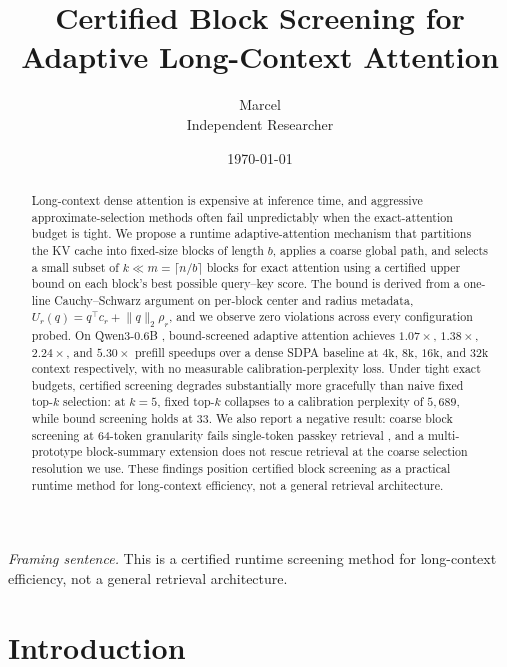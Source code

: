 \documentclass[11pt]{article}
\title{\textbf{Certified Block Screening for Adaptive Long-Context Attention}}
\author{Marcel \\ \small{Independent Researcher}}
\date{\today}
\theoremstyle{plain}
\theoremstyle{definition}
\newcommand{\ur}{U_r}
\newcommand{\normq}{\lVert q \rVert_2}
\newcommand{\rad}{\rho_r}
\begin{document}
\maketitle

\begin{abstract}
Long-context dense attention is expensive at inference time, and aggressive approximate-selection methods often fail unpredictably when the exact-attention budget is tight.
We propose a runtime adaptive-attention mechanism that partitions the KV cache into fixed-size blocks of length $b$, applies a coarse global path, and selects a small subset of $k \ll m = \lceil n/b \rceil$ blocks for exact attention using a certified upper bound on each block's best possible query--key score.
The bound is derived from a one-line Cauchy--Schwarz argument on per-block center and radius metadata, $\ur(q) = q^{\top} c_r + \normq \rad$, and we observe zero violations across every configuration probed.
On Qwen3-0.6B \citep{qwen3}, bound-screened adaptive attention achieves $1.07\times$, $1.38\times$, $2.24\times$, and $5.30\times$ prefill speedups over a dense SDPA \citep{dao2022flashattention} baseline at $4\mathrm{k}$, $8\mathrm{k}$, $16\mathrm{k}$, and $32\mathrm{k}$ context respectively, with no measurable calibration-perplexity loss.
Under tight exact budgets, certified screening degrades substantially more gracefully than naive fixed top-$k$ selection: at $k=5$, fixed top-$k$ collapses to a calibration perplexity of $5{,}689$, while bound screening holds at $33$.
We also report a negative result: coarse block screening at 64-token granularity fails single-token passkey retrieval \citep{liu2023lost}, and a multi-prototype block-summary extension does not rescue retrieval at the coarse selection resolution we use.
These findings position certified block screening as a practical runtime method for long-context efficiency, not a general retrieval architecture.
\end{abstract}

\vspace{0.5em}
\noindent\textit{Framing sentence.} This is a certified runtime screening method for long-context efficiency, not a general retrieval architecture.

\section{Introduction}
\end{document}
